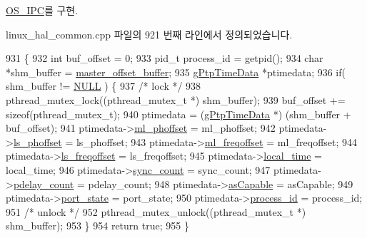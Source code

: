 \hyperlink{class_o_s___i_p_c_a33745dd660255c4161278e3bf75387dc}{O\+S\+\_\+\+I\+PC}를 구현.



linux\+\_\+hal\+\_\+common.\+cpp 파일의 921 번째 라인에서 정의되었습니다.


\begin{DoxyCode}
931 \{
932     \textcolor{keywordtype}{int} buf\_offset = 0;
933     pid\_t process\_id = getpid();
934     \textcolor{keywordtype}{char} *shm\_buffer = \hyperlink{class_linux_shared_memory_i_p_c_a028459163bd8b988344f6837036cb0be}{master\_offset\_buffer};
935     \hyperlink{structg_ptp_time_data}{gPtpTimeData} *ptimedata;
936     \textcolor{keywordflow}{if}( shm\_buffer != \hyperlink{openavb__types__base__pub_8h_a070d2ce7b6bb7e5c05602aa8c308d0c4}{NULL} ) \{
937         \textcolor{comment}{/* lock */}
938         pthread\_mutex\_lock((pthread\_mutex\_t *) shm\_buffer);
939         buf\_offset += \textcolor{keyword}{sizeof}(pthread\_mutex\_t);
940         ptimedata   = (\hyperlink{structg_ptp_time_data}{gPtpTimeData} *) (shm\_buffer + buf\_offset);
941         ptimedata->\hyperlink{structg_ptp_time_data_a707b32410dd96584191405fcc6b1b10d}{ml\_phoffset} = ml\_phoffset;
942         ptimedata->\hyperlink{structg_ptp_time_data_a092b9f356daa2757877b51e4084366be}{ls\_phoffset} = ls\_phoffset;
943         ptimedata->\hyperlink{structg_ptp_time_data_aafeb4d0fa7d3cb53ee3686b804e47617}{ml\_freqoffset} = ml\_freqoffset;
944         ptimedata->\hyperlink{structg_ptp_time_data_a396f365f5e7c66610f076359c5d99c6e}{ls\_freqoffset} = ls\_freqoffset;
945         ptimedata->\hyperlink{structg_ptp_time_data_a77a3c33b68032d5db3c0c556a80ef651}{local\_time} = local\_time;
946         ptimedata->\hyperlink{structg_ptp_time_data_ab918355ca94ac81d7397800a7ef77c0a}{sync\_count}   = sync\_count;
947         ptimedata->\hyperlink{structg_ptp_time_data_a7557e8c3c5a258ba096b5c1c274f17bf}{pdelay\_count} = pdelay\_count;
948         ptimedata->\hyperlink{structg_ptp_time_data_a15a09cf240fb37b905e4d4e1e9f5b9a1}{asCapable} = asCapable;
949         ptimedata->\hyperlink{structg_ptp_time_data_ae66554126902ed959a3b296ddd3204e8}{port\_state}   = port\_state;
950         ptimedata->\hyperlink{structg_ptp_time_data_aa5e5e89995d6bfb4b61b08fa89656812}{process\_id}   = process\_id;
951         \textcolor{comment}{/* unlock */}
952         pthread\_mutex\_unlock((pthread\_mutex\_t *) shm\_buffer);
953     \}
954     \textcolor{keywordflow}{return} \textcolor{keyword}{true};
955 \}
\end{DoxyCode}



